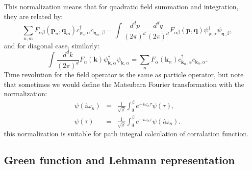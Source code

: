 \documentclass[journal=jacsat,manuscript=article]{achemso}
\begin{document}
This normalization means that for quadratic field summation and integration, they are related by:
\begin{equation}
	\sum_{n,m}F_{\alpha\beta}\left(\bm{p}_{n},\bm{q}_{m}\right)c_{\bm{p}_{n},\alpha}^{\dagger}c_{\bm{q}_{m},\beta}
	=\int\frac{d^{d}p}{\left(2\pi\right)^{d}}\frac{d^{d}q}{\left(2\pi\right)^{d}}F_{\alpha\beta}\left(\bm{p},\bm{q}\right)\psi_{\bm{p},\alpha}^{\dagger}\psi_{\bm{q},\beta},
\end{equation}
and for diagonal case, similarly:
\begin{equation}
	\int\frac{d^{d}k}{\left(2\pi\right)^{d}}F_{\alpha}\left(\bm{k}\right)\psi_{\bm{k},\alpha}^{\dagger}\psi_{\bm{k},\alpha}
 	=\sum_{n}F_{\alpha}\left(\bm{k}_{n}\right)c_{\bm{k}_{n},\alpha}^{\dagger}c_{\bm{k}_{n},\alpha}.
\end{equation}
Time revolution for the field operator is the same as particle operator, but note that sometimes we would define the Matsubara Fourier transformation with the normalization:
\begin{eqnarray}
	\psi\left(i\omega_{n}\right) & = & \frac{1}{\sqrt{\beta}}\int_{0}^{\beta}e^{+i\omega_{n}\tau}\psi\left(\tau\right),\\
	\psi\left(\tau\right) & = & \frac{1}{\sqrt{\beta}}\int_{0}^{\beta}e^{-i\omega_{n}\tau}\psi\left(i\omega_{n}\right).
\end{eqnarray}
this normalization is suitable for path integral calculation of corralation function.


\subsection{Green function and Lehmann representation}
\end{document}
